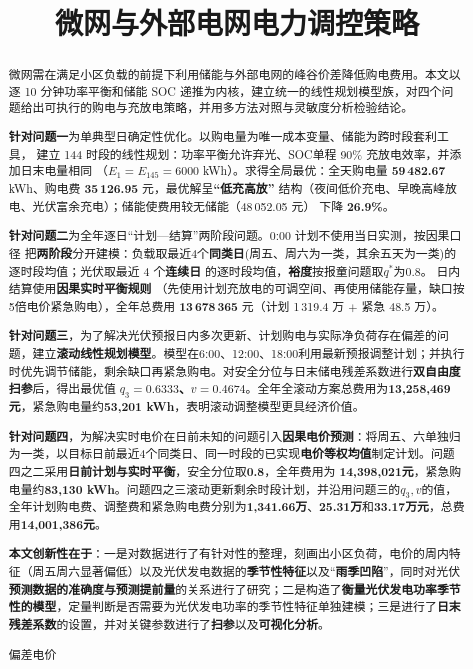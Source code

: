 \documentclass[withoutpreface,bwprint]{cumcmthesis}
\title{微网与外部电网电力调控策略}
\begin{document}
\maketitle

\begin{abstract}

微网需在满足小区负载的前提下利用储能与外部电网的峰谷价差降低购电费用。本文以逐 10 分钟功率平衡和储能 SOC 递推为内核，建立统一的线性规划模型族，对四个问题给出可执行的购电与充放电策略，并用多方法对照与灵敏度分析检验结论。

\textbf{针对问题一}为单典型日确定性优化。以购电量为唯一成本变量、储能为跨时段套利工具，
建立 144 时段的线性规划：功率平衡允许弃光、SOC单程 90\% 充放电效率，并添加日末电量相同
（$E_1=E_{145}=6000$ kWh）。求得全局最优：全天购电量 \textbf{59\,482.67} kWh、购电费 \textbf{35\,126.95} 元，最优解呈\textbf{“低充高放”}
结构（夜间低价充电、早晚高峰放电、光伏富余充电）；储能使费用较无储能（48\,052.05 元）
下降 \textbf{26.9\%}。

\textbf{针对问题二}为全年逐日“计划—结算”两阶段问题。0:00 计划不使用当日实测，按因果口径
把\textbf{两阶段}分开建模：负载取最近4个\textbf{同类日}(周五、周六为一类，其余五天为一类)的逐时段均值；光伏取最近 4 个\textbf{连续日}
的逐时段均值，\textbf{裕度}按报童问题取$q^*$为0.8。
日内结算使用\textbf{因果实时平衡规则}
（先使用计划充放电的可调空间、再使用储能存量，缺口按5倍电价紧急购电），全年总费用 \textbf{13\,678\,365} 元（计划 1\,319.4 万 $+$ 紧急 48.5 万）。


\textbf{针对问题三}，为了解决光伏预报日内多次更新、计划购电与实际净负荷存在偏差的问题，建立\textbf{滚动线性规划模型}。模型在6:00、12:00、18:00利用最新预报调整计划；并执行时优先调节储能，剩余缺口再紧急购电。对安全分位与日末储电残差系数进行\textbf{双自由度扫参}后，得出最优值 \textbf{\(q_3=0.6333\)、\(v=0.4674\)}。全年全滚动方案总费用为\textbf{13,258,469元}，紧急购电量约\textbf{53,201 kWh}，表明滚动调整模型更具经济价值。

\textbf{针对问题四}，为解决实时电价在日前未知的问题引入\textbf{因果电价预测}：将周五、六单独归为一类，以目标日前最近4个同类日、同一时段的已实现\textbf{电价等权均值}制定计划。问题四之二采用\textbf{日前计划与实时平衡}，安全分位取\textbf{0.8}，全年费用为 \textbf{14,398,021元}，紧急购电量约\textbf{83,130 kWh}。问题四之三滚动更新剩余时段计划，并沿用问题三的$q_3,v$的值，全年计划购电费、调整费和紧急购电费分别为\textbf{1,341.66万}、\textbf{25.31万}和\textbf{33.17万元}，总费用\textbf{14,001,386元}。

\textbf{本文创新性在于}：一是对数据进行了有针对性的整理，刻画出小区负荷，电价的周内特征（周五周六显著偏低）以及光伏发电数据的\textbf{季节性特征}以及“\textbf{雨季凹陷}”，同时对光伏\textbf{预测数据的准确度与预测提前量}的关系进行了研究；二是构造了\textbf{衡量光伏发电功率季节性的模型}，定量判断是否需要为光伏发电功率的季节性特征单独建模；三是进行了\textbf{日末残差系数}的设置，并对关键参数进行了\textbf{扫参}以及\textbf{可视化分析}。

\enspace 偏差电价
\end{abstract}
\end{document}
